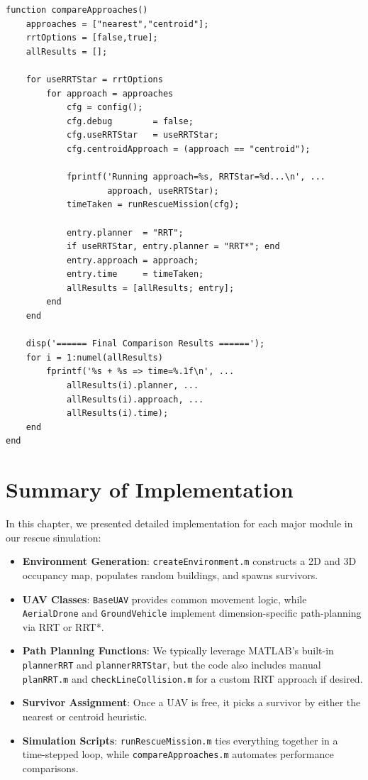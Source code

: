 \documentclass[12pt,a4paper]{report}
\begin{document}
\begin{verbatim}
function compareApproaches()
    approaches = ["nearest","centroid"];
    rrtOptions = [false,true];
    allResults = [];

    for useRRTStar = rrtOptions
        for approach = approaches
            cfg = config();
            cfg.debug        = false;
            cfg.useRRTStar   = useRRTStar;
            cfg.centroidApproach = (approach == "centroid");

            fprintf('Running approach=%s, RRTStar=%d...\n', ...
                    approach, useRRTStar);
            timeTaken = runRescueMission(cfg);

            entry.planner  = "RRT";
            if useRRTStar, entry.planner = "RRT*"; end
            entry.approach = approach;
            entry.time     = timeTaken;
            allResults = [allResults; entry];
        end
    end

    disp('====== Final Comparison Results ======');
    for i = 1:numel(allResults)
        fprintf('%s + %s => time=%.1f\n', ...
            allResults(i).planner, ...
            allResults(i).approach, ...
            allResults(i).time);
    end
end
\end{verbatim}

\section{Summary of Implementation}
\label{sec:summary_implementation}

In this chapter, we presented detailed implementation for each major module 
in our rescue simulation:

\begin{itemize}
    \item \textbf{Environment Generation}: \texttt{createEnvironment.m} constructs a
          2D and 3D occupancy map, populates random buildings, and spawns survivors.
    \item \textbf{UAV Classes}: \texttt{BaseUAV} provides common movement logic, while
          \texttt{AerialDrone} and \texttt{GroundVehicle} implement dimension-specific
          path-planning via RRT or RRT*.
    \item \textbf{Path Planning Functions}: We typically leverage MATLAB’s built-in
          \texttt{plannerRRT} and \texttt{plannerRRTStar}, but the code also includes
          manual \texttt{planRRT.m} and \texttt{checkLineCollision.m} for a custom
          RRT approach if desired.
    \item \textbf{Survivor Assignment}: Once a UAV is free, it picks a survivor
          by either the nearest or centroid heuristic.
    \item \textbf{Simulation Scripts}: \texttt{runRescueMission.m} ties everything
          together in a time-stepped loop, while \texttt{compareApproaches.m}
          automates performance comparisons.
\end{itemize}
\end{document}
